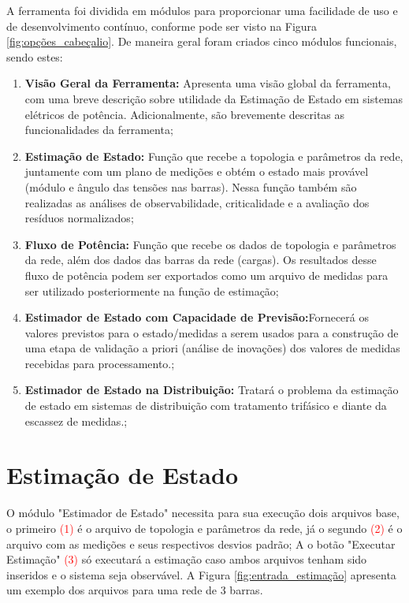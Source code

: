 \documentclass{article}
\begin{document}
A ferramenta foi dividida em módulos para proporcionar uma facilidade de uso e de desenvolvimento contínuo, conforme pode ser visto na Figura \ref{fig:opções_cabeçalio}. De maneira geral foram criados cinco módulos funcionais, sendo estes:
\begin{enumerate}
    \item \textbf{Visão Geral da Ferramenta:} Apresenta uma visão global da ferramenta, com uma breve descrição sobre utilidade da Estimação de Estado em sistemas elétricos de potência. Adicionalmente, são brevemente descritas as funcionalidades da ferramenta;
    \item \textbf{Estimação de Estado:} Função que recebe a topologia e parâmetros da rede, juntamente com um plano de medições e obtém o estado mais provável (módulo e ângulo das tensões nas barras). Nessa função também são realizadas as análises de observabilidade, criticalidade e a avaliação dos resíduos normalizados;
    \item \textbf{Fluxo de Potência:} Função que recebe os dados de topologia e parâmetros da rede, além dos dados das barras da rede (cargas). Os resultados desse fluxo de potência podem ser exportados como um arquivo de medidas para ser utilizado posteriormente na função de estimação;
    \item \textbf{Estimador de Estado com Capacidade de Previsão:}Fornecerá os valores previstos para o estado/medidas a serem usados para a construção de uma etapa de validação a priori (análise de inovações) dos valores de medidas recebidas para processamento.;
    \item \textbf{Estimador de Estado na Distribuição:} Tratará o problema da estimação de estado em sistemas de distribuição com tratamento trifásico e diante da escassez de medidas.;
\end{enumerate}


\section{Estimação de Estado}

O módulo "Estimador de Estado" necessita para sua execução  dois arquivos base, o primeiro \textcolor{red}{(1)} é o arquivo de topologia e parâmetros da rede, já o segundo \textcolor{red}{(2)} é o arquivo com as medições e seus respectivos desvios padrão; A o botão "Executar Estimação" \textcolor{red}{(3)} só executará a estimação caso ambos arquivos tenham sido inseridos e o sistema seja observável. A Figura \ref{fig:entrada_estimação} apresenta um exemplo dos arquivos para uma rede de 3 barras.  
\end{document}
